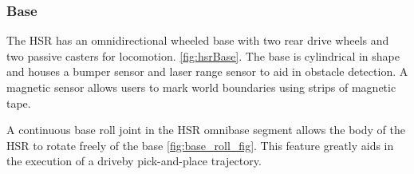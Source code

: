 \documentclass[12pt]{article}
\begin{document}
        \subsubsection{Base} 
            The HSR has an omnidirectional wheeled base with two rear drive wheels and two passive casters for locomotion. \autoref{fig:hsrBase}. The base is cylindrical in shape and houses a bumper sensor and laser range sensor to aid in obstacle detection. A magnetic sensor allows users to mark world boundaries using strips of magnetic tape.
            \par [The omnibase of the HSR uses differential steering to turn and move forwards and backwards.][Need to go through: A mobile platform with a dual-wheel caster-drive mechanism for holonomic and omnidirectional mobile robots reference. similar to differential drive but some key differences. They somehow claim holonomicity. paper is in japanese though.] A continuous base roll joint in the HSR omnibase segment allows the body of the HSR to rotate freely of the base \autoref{fig:base_roll_fig}. This feature greatly aids in the execution of a driveby pick-and-place trajectory.
\end{document}
